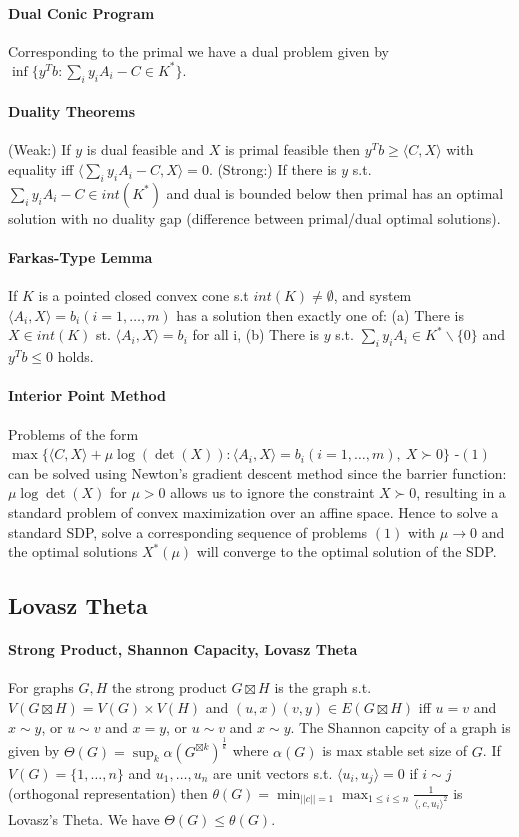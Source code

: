 \documentclass[letterpaper,11pt,oneside,onecolumn]{article}
\begin{document}
\paragraph{Dual Conic Program} Corresponding to the primal we have a dual problem given by $\inf \{ y^Tb : \sum_i y_iA_i - C \in K^*\}.$
\paragraph{Duality Theorems} (Weak:) If $y$ is dual feasible and $X$ is primal feasible then $y^Tb \geq \langle C, X\rangle$ with equality iff $\langle \sum_i y_i A_i - C, X\rangle = 0$. (Strong:) If there is $y$ s.t. $\sum_i y_i A_i - C \in int(K^*)$ and dual is bounded below then primal has an optimal solution with no duality gap (difference between primal/dual optimal solutions).
\paragraph{Farkas-Type Lemma} If $K$ is a pointed closed convex cone s.t $int(K) \neq \emptyset$, and system $\langle A_i, X \rangle = b_i (i=1,\dots,m)$ has a solution then exactly one of: (a) There is $X \in int (K)$ st. $\langle A_i, X\rangle = b_i$ for all i, (b) There is $y$ s.t. $\sum_i y_i A_i \in K^*\backslash \{0\}$ and $y^Tb \leq 0$ holds.
\paragraph{Interior Point Method} Problems of the form $\max\{\langle C, X\rangle + \mu \log(\det(X)) : \langle A_i, X\rangle = b_i (i=1,\dots,m),\ X\succ 0 \}$ -$(1)$ can be solved using Newton's gradient descent method since the barrier function: $\mu \log\det(X)$ for $\mu > 0$ allows us to ignore the constraint $X \succ 0$, resulting in a standard problem of convex maximization over an affine space. Hence to solve a standard SDP, solve a corresponding sequence of problems $(1)$ with $\mu \rightarrow 0$ and the optimal solutions $X^*(\mu)$ will converge to the optimal solution of the SDP.
\subsection*{Lovasz Theta}
\paragraph{Strong Product, Shannon Capacity, Lovasz Theta} For graphs $G, H$ the strong product $G \boxtimes H$ is the graph s.t. $V(G\boxtimes H) = V(G) \times V(H)$ and $(u,x)(v,y) \in E(G\boxtimes H)$ iff $u=v$ and $x \sim y$, or $u\sim v$ and $x=y$, or $u\sim v$ and $x\sim y$. The Shannon capcity of a graph is given by $\Theta(G) = \sup_k \alpha(G^{\boxtimes k})^\frac{1}{k}$ where $\alpha(G)$ is max stable set size of $G$. If $V(G) = \{1,\dots, n\}$ and $u_1, \dots, u_n$ are unit vectors s.t. $\langle u_i, u_j\rangle = 0$ if $i \sim j$ (orthogonal representation) then $\theta(G) = \min_{||c|| = 1} \max_{1\leq i \leq n} \frac{1}{\langle, c,u_i\rangle^2}$ is Lovasz's Theta. We have $\Theta(G) \leq \theta (G)$.
\end{document}
